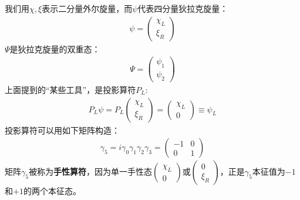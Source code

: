 我们用$\chi, \xi$表示二分量外尔旋量，而$\psi$代表四分量狄拉克旋量：
\begin{align}
\psi=\begin{pmatrix}\chi_L\\\xi_R\end{pmatrix}
\label{equ7.98}
\end{align}
$\Psi$是狄拉克旋量的双重态：
\begin{align}
\Psi=\begin{pmatrix}\psi_1\\\psi_2\end{pmatrix}
\label{equ7.99}
\end{align}
上面提到的“某些工具”，是投影算符$P_L$:
\begin{align}
P_L\psi=P_L\begin{pmatrix}\chi_L\\\xi_R\end{pmatrix}=\begin{pmatrix}\chi_L\\0\end{pmatrix}\equiv \psi_L
\label{equ7.100}
\end{align}
投影算符可以用如下矩阵构造：
\begin{align}
\gamma_5=i\gamma_0\gamma_1\gamma_2\gamma_3=\begin{pmatrix}-1 & 0 \\ 0 & 1\end{pmatrix}
\label{equ7.101}
\end{align}
矩阵$\gamma_5$被称为{\bf 手性算符}，因为单一手性态$\begin{pmatrix}\chi_L\\0\end{pmatrix}$或$\begin{pmatrix}0\\\xi_R\end{pmatrix}$，正是$\gamma_5$本征值为$-1$和$+1$的两个本征态。

